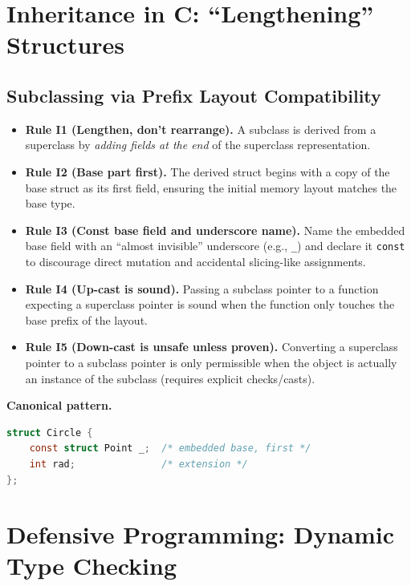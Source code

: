 \documentclass[11pt]{article}
\begin{document}
\section{Inheritance in C: ``Lengthening'' Structures}

\subsection{Subclassing via Prefix Layout Compatibility}

\begin{itemize}
  \item \textbf{Rule I1 (Lengthen, don't rearrange).} A subclass is derived from a superclass by \emph{adding fields at the end} of the superclass representation.
  \item \textbf{Rule I2 (Base part first).} The derived struct begins with a copy of the base struct as its first field, ensuring the initial memory layout matches the base type.
  \item \textbf{Rule I3 (Const base field and underscore name).} Name the embedded base field with an ``almost invisible'' underscore (e.g., \texttt{\_}) and declare it \texttt{const} to discourage direct mutation and accidental slicing-like assignments.
  \item \textbf{Rule I4 (Up-cast is sound).} Passing a subclass pointer to a function expecting a superclass pointer is sound when the function only touches the base prefix of the layout.
  \item \textbf{Rule I5 (Down-cast is unsafe unless proven).} Converting a superclass pointer to a subclass pointer is only permissible when the object is actually an instance of the subclass (requires explicit checks/casts).
\end{itemize}

\noindent\textbf{Canonical pattern.}
\begin{lstlisting}[language=C]
struct Circle {
    const struct Point _;  /* embedded base, first */
    int rad;               /* extension */
};
\end{lstlisting}

\section{Defensive Programming: Dynamic Type Checking}
\end{document}
